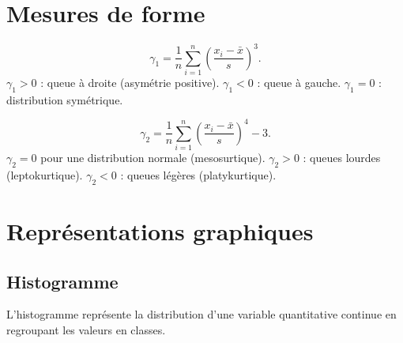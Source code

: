 \section{Mesures de forme}

\begin{definition}
\[
\gamma_1 = \frac{1}{n}\sum_{i=1}^n\left(\frac{x_i-\bar{x}}{s}\right)^3.
\]
$\gamma_1>0$ : queue \`a droite (asym\'etrie positive). $\gamma_1<0$ : queue \`a gauche. $\gamma_1=0$ : distribution sym\'etrique.
\end{definition}

\begin{definition}
\[
\gamma_2 = \frac{1}{n}\sum_{i=1}^n\left(\frac{x_i-\bar{x}}{s}\right)^4 - 3.
\]
$\gamma_2=0$ pour une distribution normale (mesosurtique). $\gamma_2>0$ : queues lourdes (leptokurtique). $\gamma_2<0$ : queues l\'eg\`eres (platykurtique).
\end{definition}

\section{Repr\'esentations graphiques}

\subsection{Histogramme}

L'histogramme repr\'esente la distribution d'une variable quantitative continue en regroupant les valeurs en classes.

\begin{center}
\end{center}

